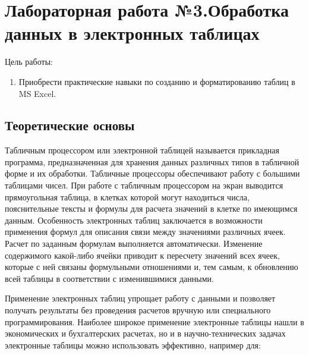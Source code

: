 

%

\section{Лабораторная работа №3.\newline Обработка данных в электронных таблицах}

Цель работы:
\begin{enumerate}
    \item Приобрести практические навыки по созданию и форматированию таблиц в MS Excel.
\end{enumerate}
\subsection{Теоретические основы}

Табличным процессором или электронной таблицей называется прикладная программа, предназначенная для хранения данных различных типов в табличной форме и их обработки. Табличные процессоры обеспечивают работу с большими таблицами чисел. При работе с табличным процессором на экран выводится прямоугольная таблица, в клетках которой могут находиться числа, пояснительные тексты и формулы для расчета значений в клетке по имеющимся данным. Особенность электронных таблиц заключается в возможности применения формул для описания связи между значениями различных ячеек. Расчет по заданным формулам выполняется автоматически. Изменение содержимого какой-либо ячейки приводит к пересчету значений всех ячеек, которые с ней связаны формульными отношениями и, тем самым, к обновлению всей таблицы в соответствии с изменившимися данными.

Применение электронных таблиц упрощает работу с данными и позволяет получать результаты без проведения расчетов вручную или специального программирования. Наиболее широкое применение электронные таблицы нашли в экономических и бухгалтерских расчетах, но и в научно-технических задачах электронные таблицы можно использовать эффективно, например для:

